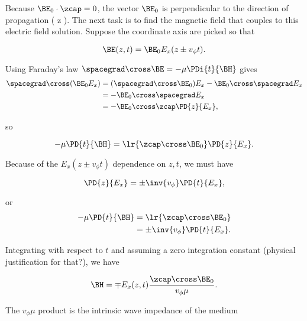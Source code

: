 Because \( \BE_0 \cdot \zcap = 0 \), the vector \( \BE_0 \) is perpendicular to the direction of propagation ( z ).  The next task is to find the magnetic field that couples to this electric field solution.  Suppose the coordinate axis are picked so that

\begin{equation}\label{eqn:uwavesLecture2:360}
\BE(z, t) = \BE_0 E_x( z \pm v_\phi t).
\end{equation}

Using Faraday's law \( \spacegrad \cross \BE = -\mu \PDi{t}{\BH} \) gives
\begin{equation}\label{eqn:uwavesLecture2:380}
\begin{aligned}
\spacegrad \cross (\BE_0 E_x)
&=
(\spacegrad \cross \BE_0) E_x
-\BE_0 \cross \spacegrad E_x
\\ &=
-\BE_0 \cross \spacegrad E_x
\\ &=
-\BE_0 \cross \zcap \PD{z}{E_x},
\end{aligned}
\end{equation}

so

\begin{equation}\label{eqn:uwavesLecture2:460}
-\mu \PD{t}{\BH} =
\lr{ \zcap \cross \BE_0 } \PD{z}{E_x}.
\end{equation}

Because of the \( E_x( z \pm v_\phi t ) \) dependence on \( z, t \), we must have

\begin{equation}\label{eqn:uwavesLecture2:480}
\PD{z}{E_x} = \pm \inv{v_\phi} \PD{t}{E_x},
\end{equation}

or
\begin{equation}\label{eqn:uwavesLecture2:500}
\begin{aligned}
-\mu \PD{t}{\BH} &=
\lr{ \zcap \cross \BE_0 }
\\ &= \pm \inv{v_\phi} \PD{t}{E_x}.
\end{aligned}
\end{equation}

Integrating with respect to \( t \) and assuming a zero integration constant (physical justification for that?), we have

\begin{equation}\label{eqn:uwavesLecture2:520}
\BH = \mp E_x(z, t) \frac{\zcap \cross \BE_0}{v_\phi \mu}.
\end{equation}

The \( v_\phi \mu \) product is the intrinsic wave impedance of the medium

